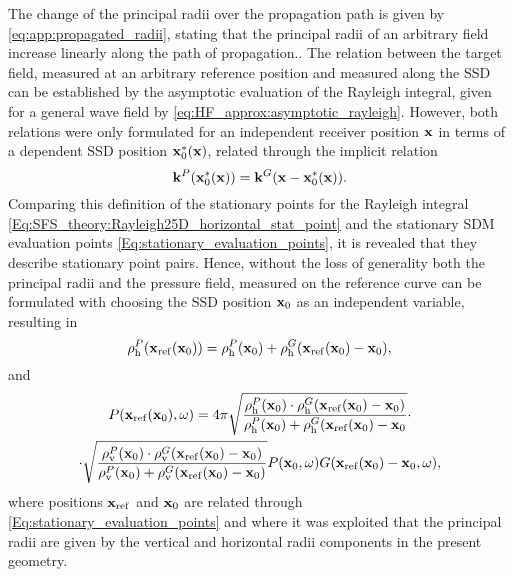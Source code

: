 The change of the principal radii over the propagation path is given by \eqref{eq:app:propagated_radii}, stating that the principal radii of an arbitrary field increase linearly along the path of propagation..
The relation between the target field, measured at an arbitrary reference position and measured along the SSD can be established by the asymptotic evaluation of the Rayleigh integral, given for a general wave field by \eqref{eq:HF_approx:asymptotic_rayleigh}.
However, both relations were only formulated for an independent receiver position $\mathbf{x}$ in terms of a dependent SSD position $\mathbf{x}_0^*(\mathbf{x})$, related through the implicit relation
\begin{equation}
\label{Eq:SFS_theory:Rayleigh25D_horizontal_stat_point}
\mathbf{k}^P(\mathbf{x}_0^*(\mathbf{x})) = \mathbf{k}^G( \mathbf{x} - \mathbf{x}_0^*(\mathbf{x})).
\end{equation}
Comparing this definition of the stationary points for the Rayleigh integral \eqref{Eq:SFS_theory:Rayleigh25D_horizontal_stat_point} and the stationary SDM evaluation points \eqref{Eq:stationary_evaluation_points}, it is revealed that they describe stationary point pairs.
Hence, without the loss of generality both the principal radii and the pressure field, measured on the reference curve can be formulated with choosing the SSD position $\mathbf{x}_0$ as an independent variable, resulting in
\begin{equation}
\label{Eq:principal_radii_addition}
\rho_\mathrm{h}^P(\mathbf{x}_{\mathrm{ref}}(\mathbf{x}_0)) = \rho_\mathrm{h}^P(\mathbf{x}_0) + \rho_\mathrm{h}^G(\mathbf{x}_{\mathrm{ref}}(\mathbf{x}_0)-\mathbf{x}_0),
\end{equation}
and
\small
\begin{multline}
\label{Eq:Asymptotic_Rayleigh_integral}
P(\mathbf{x}_{\mathrm{ref}}(\mathbf{x}_0),\omega) = 
4\pi
\sqrt{\frac{\rho_\mathrm{h}^P(\mathbf{x}_0) \cdot \rho_\mathrm{h}^G(\mathbf{x}_{\mathrm{ref}}(\mathbf{x}_0)-\mathbf{x}_0)}{\rho_\mathrm{h}^P(\mathbf{x}_0) + \rho_\mathrm{h}^G(\mathbf{x}_{\mathrm{ref}}(\mathbf{x}_0)-\mathbf{x}_0}} \cdot \\ \cdot
\sqrt{\frac{\rho_\mathrm{v}^P(\mathbf{x}_0) \cdot \rho_\mathrm{v}^G(\mathbf{x}_{\mathrm{ref}}(\mathbf{x}_0)-\mathbf{x}_0)}{\rho_\mathrm{v}^P(\mathbf{x}_0) + \rho_\mathrm{v}^G(\mathbf{x}_{\mathrm{ref}}(\mathbf{x}_0)-\mathbf{x}_0)}}
P(\mathbf{x}_0,\omega) G(\mathbf{x}_{\mathrm{ref}}(\mathbf{x}_0)-\mathbf{x}_0,\omega)
,
\end{multline} %
\normalsize
where positions $\mathbf{x}_{\mathrm{ref}}$ and $\mathbf{x}_0$ are related through \eqref{Eq:stationary_evaluation_points} and where it was exploited that the principal radii are given by the vertical and horizontal radii components in the present geometry.

